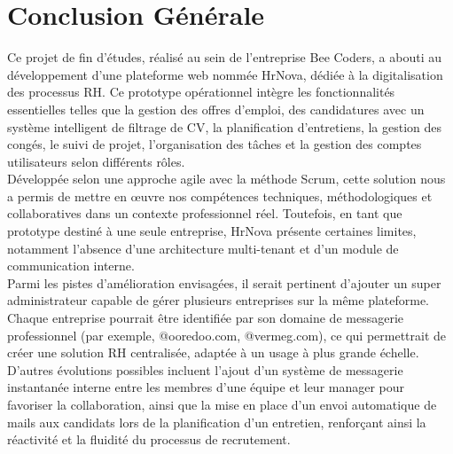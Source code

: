 \vspace{50mm}
\chapter*{Conclusion Générale}
Ce projet de fin d’études, réalisé au sein de l’entreprise Bee Coders, a abouti au développement d’une plateforme web nommée HrNova, dédiée à la digitalisation des processus RH. Ce prototype opérationnel intègre les fonctionnalités essentielles telles que la gestion des offres d’emploi, des candidatures avec un système intelligent de filtrage de CV, la planification d’entretiens, la gestion des congés, le suivi de projet, l’organisation des tâches et la gestion des comptes utilisateurs selon différents rôles. \\
 
Développée selon une approche agile avec la méthode Scrum, cette solution nous a permis de mettre en œuvre nos compétences techniques, méthodologiques et collaboratives dans un contexte professionnel réel. Toutefois, en tant que prototype destiné à une seule entreprise, HrNova présente certaines limites, notamment l'absence d’une architecture multi-tenant et d’un module de communication interne. \\

Parmi les pistes d’amélioration envisagées, il serait pertinent d’ajouter un super administrateur capable de gérer plusieurs entreprises sur la même plateforme. Chaque entreprise pourrait être identifiée par son domaine de messagerie professionnel (par exemple, @ooredoo.com, @vermeg.com), ce qui permettrait de créer une solution RH centralisée, adaptée à un usage à plus grande échelle. D'autres évolutions possibles incluent l’ajout d’un système de messagerie instantanée interne entre les membres d’une équipe et leur manager pour favoriser la collaboration, ainsi que la mise en place d’un envoi automatique de mails aux candidats lors de la planification d’un entretien, renforçant ainsi la réactivité et la fluidité du processus de recrutement. \\



